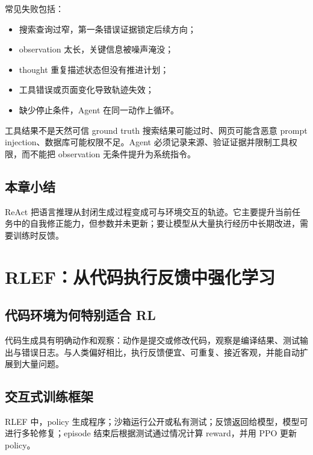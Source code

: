 \documentclass[a4paper]{article}
\begin{document}
常见失败包括：

\begin{itemize}
    \item 搜索查询过窄，第一条错误证据锁定后续方向；
    \item observation 太长，关键信息被噪声淹没；
    \item thought 重复描述状态但没有推进计划；
    \item 工具错误或页面变化导致轨迹失效；
    \item 缺少停止条件，Agent 在同一动作上循环。
\end{itemize}

\begin{warningbox}{工具结果不是天然可信 ground truth}
搜索结果可能过时、网页可能含恶意 prompt injection、数据库可能权限不足。Agent 必须记录来源、验证证据并限制工具权限，而不能把 observation 无条件提升为系统指令。
\end{warningbox}

\subsection{本章小结}

ReAct 把语言推理从封闭生成过程变成可与环境交互的轨迹。它主要提升当前任务中的自我修正能力，但参数并未更新；要让模型从大量执行经历中长期改进，需要训练时反馈。

\section{RLEF：从代码执行反馈中强化学习}

\subsection{代码环境为何特别适合 RL}

代码生成具有明确动作和观察：动作是提交或修改代码，观察是编译结果、测试输出与错误日志。与人类偏好相比，执行反馈便宜、可重复、接近客观，并能自动扩展到大量问题。


\subsection{交互式训练框架}

RLEF 中，policy 生成程序；沙箱运行公开或私有测试；反馈返回给模型，模型可进行多轮修复；episode 结束后根据测试通过情况计算 reward，并用 PPO 更新 policy。
\end{document}
